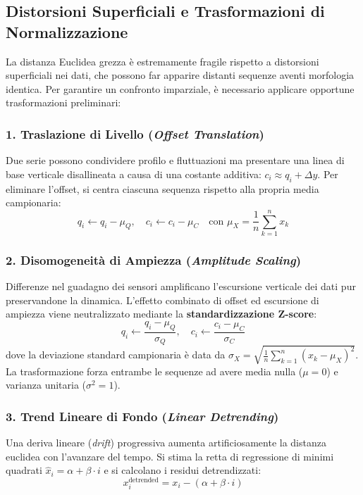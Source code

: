 \FloatBarrier
\subsection{Distorsioni Superficiali e Trasformazioni di Normalizzazione}
\label{subsec:ts-distortions-normalizations}

La distanza Euclidea grezza \`e estremamente fragile rispetto a distorsioni superficiali nei dati, che possono far apparire distanti sequenze aventi morfologia identica. Per garantire un confronto imparziale, \`e necessario applicare opportune trasformazioni preliminari:

\subsubsection{1. Traslazione di Livello (\textit{Offset Translation})}
Due serie possono condividere profilo e fluttuazioni ma presentare una linea di base verticale disallineata a causa di una costante additiva: $c_i \approx q_i + \Delta y$. Per eliminare l'offset, si centra ciascuna sequenza rispetto alla propria media campionaria:
\begin{equation}
\label{eq:ts-offset-removal}
q_i \leftarrow q_i - \mu_Q, \quad c_i \leftarrow c_i - \mu_C \quad \text{con } \mu_X = \frac{1}{n}\sum_{k=1}^n x_k
\end{equation}

\subsubsection{2. Disomogeneit\`a di Ampiezza (\textit{Amplitude Scaling})}
Differenze nel guadagno dei sensori amplificano l'escursione verticale dei dati pur preservandone la dinamica. L'effetto combinato di offset ed escursione di ampiezza viene neutralizzato mediante la \textbf{standardizzazione Z-score}:
\begin{equation}
\label{eq:ts-zscore}
q_i \leftarrow \frac{q_i - \mu_Q}{\sigma_Q}, \quad c_i \leftarrow \frac{c_i - \mu_C}{\sigma_C}
\end{equation}
dove la deviazione standard campionaria \`e data da $\sigma_X = \sqrt{\frac{1}{n}\sum_{k=1}^n (x_k - \mu_X)^2}$. La trasformazione forza entrambe le sequenze ad avere media nulla ($\mu=0$) e varianza unitaria ($\sigma^2=1$).

\subsubsection{3. Trend Lineare di Fondo (\textit{Linear Detrending})}
Una deriva lineare (\textit{drift}) progressiva aumenta artificiosamente la distanza euclidea con l'avanzare del tempo. Si stima la retta di regressione di minimi quadrati $\hat{x}_i = \alpha + \beta \cdot i$ e si calcolano i residui detrendizzati:
\begin{equation}
\label{eq:ts-detrend}
x_i^{\text{detrended}} = x_i - (\alpha + \beta \cdot i)
\end{equation}


